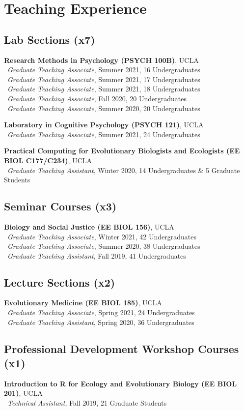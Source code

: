 \section*{Teaching Experience}
\subsection*{Lab Sections (x7)}
\textbf{Research Methods in Psychology (PSYCH 100B)}, UCLA\\
\textendash\ \textit{Graduate Teaching Associate}, Summer 2021, 16 Undergraduates\\
\textendash\ \textit{Graduate Teaching Associate}, Summer 2021, 17 Undergraduates\\
\textendash\ \textit{Graduate Teaching Associate}, Summer 2021, 18 Undergraduates\\
\textendash\ \textit{Graduate Teaching Associate}, Fall 2020, 20 Undergraduates\\
\textendash\ \textit{Graduate Teaching Associate}, Summer 2020, 20 Undergraduates

\pubspace

\textbf{Laboratory in Cognitive Psychology (PSYCH 121)}, UCLA\\
\textendash\ \textit{Graduate Teaching Associate}, Summer 2021, 24 Undergraduates

\pubspace

\textbf{Practical Computing for Evolutionary Biologists and Ecologists (EE BIOL C177/C234)}, UCLA\\
\textendash\ \textit{Graduate Teaching Assistant}, Winter 2020, 14 Undergraduates \& 5 Graduate Students

\subsection*{Seminar Courses (x3)}
\textbf{Biology and Social Justice (EE BIOL 156)}, UCLA\\
\textendash\ \textit{Graduate Teaching Associate}, Winter 2021, 42 Undergraduates\\
\textendash\ \textit{Graduate Teaching Associate}, Summer 2020, 38 Undergraduates\\
\textendash\ \textit{Graduate Teaching Assistant}, Fall 2019, 41 Undergraduates

\subsection*{Lecture Sections (x2)}
\textbf{Evolutionary Medicine (EE BIOL 185)}, UCLA\\
\textendash\ \textit{Graduate Teaching Associate}, Spring 2021, 24 Undergraduates\\
\textendash\ \textit{Graduate Teaching Assistant}, Spring 2020, 36 Undergraduates

\subsection*{Professional Development Workshop Courses (x1)}
\textbf{Introduction to R for Ecology and Evolutionary Biology (EE BIOL 201)}, UCLA\\
\textendash\ \textit{Technical Assistant}, Fall 2019, 21 Graduate Students